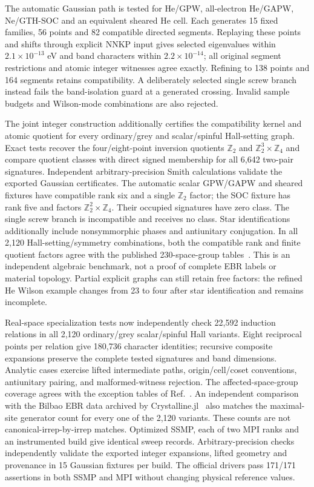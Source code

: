 The automatic Gaussian path is tested for He/GPW, all-electron
He/GAPW, Ne/GTH-SOC and an equivalent sheared He cell. Each generates
15 fixed families, 56 points and 82 compatible directed segments.
Replaying these points and shifts through explicit NNKP input gives
selected eigenvalues within $2.1\times10^{-13}$ eV and band characters
within $2.2\times10^{-14}$; all original segment restrictions and atomic
integer witnesses agree exactly. Refining to 138 points and 164
segments retains compatibility. A deliberately selected single screw
branch instead fails the band-isolation guard at a generated crossing.
Invalid sample budgets and Wilson-mode combinations are also rejected.

The joint integer construction additionally certifies the compatibility
kernel and atomic quotient for every ordinary/grey and scalar/spinful
Hall-setting graph. Exact tests recover the four/eight-point inversion
quotients $\mathbb Z_2$ and $\mathbb Z_2^3\times\mathbb Z_4$ and
compare quotient classes with direct signed membership for all
6,642 two-pair signatures. Independent arbitrary-precision Smith
calculations validate the exported Gaussian certificates. The automatic
scalar GPW/GAPW and sheared fixtures have compatible rank six and a
single $\mathbb Z_2$ factor; the SOC fixture has rank five and factors
$\mathbb Z_2^2\times\mathbb Z_4$. Their occupied signatures have
zero class. The single screw branch is incompatible and receives no
class. Star identifications additionally include nonsymmorphic phases
and antiunitary conjugation. In all 2,120 Hall-setting/symmetry
combinations, both the compatible rank and finite quotient factors
agree with the published 230-space-group tables~\cite{Po2017}.
This is an independent algebraic benchmark, not a proof of complete
EBR labels or material topology. Partial explicit graphs can still
retain free factors: the refined He Wilson example changes from 23
to four after star identification and remains incomplete.

Real-space specialization tests now independently check 22,592
induction relations in all 2,120 ordinary/grey scalar/spinful Hall
variants. Eight reciprocal points per relation give 180,736 character
identities; recursive composite expansions preserve the complete
tested signatures and band dimensions. Analytic cases exercise lifted
intermediate paths, origin/cell/coset conventions, antiunitary pairing,
and malformed-witness rejection. The affected-space-group coverage
agrees with the exception tables of Ref.~\cite{Cano2018}. An independent
comparison with the Bilbao EBR data archived by
Crystalline.jl~\cite{CrystallineEBRData} also matches the maximal-site
generator count for every one of the 2,120 variants. These counts are
not canonical-irrep-by-irrep matches. Optimized SSMP, each of two MPI
ranks and an instrumented build give identical sweep records.
Arbitrary-precision checks independently validate the exported
integer expansions, lifted geometry and provenance in 15 Gaussian
fixtures per build. The official drivers pass 171/171 assertions in
both SSMP and MPI without changing physical reference values.

